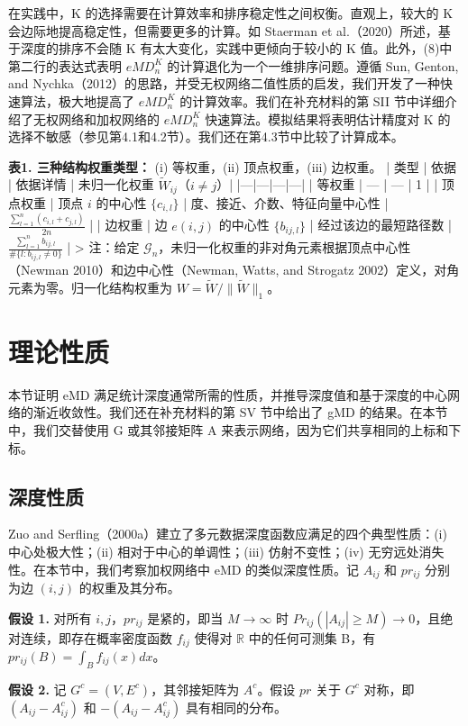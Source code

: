 \documentclass[
  10
]{article}
\begin{document}
在实践中，K 的选择需要在计算效率和排序稳定性之间权衡。直观上，较大的 K 会边际地提高稳定性，但需要更多的计算。如 Staerman et al.（2020）所述，基于深度的排序不会随 K 有太大变化，实践中更倾向于较小的 K 值。此外，(8)中第二行的表达式表明 $eMD_n^K$ 的计算退化为一个一维排序问题。遵循 Sun, Genton, and Nychka（2012）的思路，并受无权网络二值性质的启发，我们开发了一种快速算法，极大地提高了 $eMD_n^K$ 的计算效率。我们在补充材料的第 SII 节中详细介绍了无权网络和加权网络的 $eMD_n^K$ 快速算法。模拟结果将表明估计精度对 K 的选择不敏感（参见第4.1和4.2节）。我们还在第4.3节中比较了计算成本。

\textbf{表1. 三种结构权重类型：} (i) 等权重，(ii) 顶点权重，(iii) 边权重。
| 类型 | 依据 | 依据详情 | 未归一化权重 $\widetilde{W}_{ij}$（$i\neq j$）|
|---|---|---|---|
| 等权重 | — | — | 1 |
| 顶点权重 | 顶点 $i$ 的中心性 $\{c_{i,l}\}$ | 度、接近、介数、特征向量中心性 | $\frac{\sum_{l=1}^n(c_{i,l}+c_{j,l})}{2n}$ |
| 边权重 | 边 $e(i,j)$ 的中心性 $\{b_{ij,l}\}$ | 经过该边的最短路径数 | $\frac{\sum_{l=1}^n b_{ij,l}}{\#\{l:b_{ij,l}\neq0\}}$ |
>
注：给定 $\mathcal{G}_n$，未归一化权重的非对角元素根据顶点中心性（Newman 2010）和边中心性（Newman, Watts, and Strogatz 2002）定义，对角元素为零。归一化结构权重为 $W=\widetilde{W}/\|\widetilde{W}\|_1$。

\section{理论性质}

本节证明 eMD 满足统计深度通常所需的性质，并推导深度值和基于深度的中心网络的渐近收敛性。我们还在补充材料的第 SV 节中给出了 gMD 的结果。在本节中，我们交替使用 G 或其邻接矩阵 A 来表示网络，因为它们共享相同的上标和下标。

\subsection{深度性质}

Zuo and Serfling（2000a）建立了多元数据深度函数应满足的四个典型性质：(i) 中心处极大性；(ii) 相对于中心的单调性；(iii) 仿射不变性；(iv) 无穷远处消失性。在本节中，我们考察加权网络中 eMD 的类似深度性质。记 $A_{ij}$ 和 $pr_{ij}$ 分别为边 $(i,j)$ 的权重及其分布。

\textbf{假设 1.} 对所有 $i,j$，$pr_{ij}$ 是紧的，即当 $M\to\infty$ 时 $Pr_{ij}(|A_{ij}|\geq M)\to 0$，且绝对连续，即存在概率密度函数 $f_{ij}$ 使得对 $\mathbb{R}$ 中的任何可测集 B，有 $pr_{ij}(B)=\int_B f_{ij}(x)dx$。

\textbf{假设 2.} 记 $G^c=(V,E^c)$，其邻接矩阵为 $A^c$。假设 $pr$ 关于 $G^c$ 对称，即 $(A_{ij}-A_{ij}^c)$ 和 $-(A_{ij}-A_{ij}^c)$ 具有相同的分布。
\end{document}

